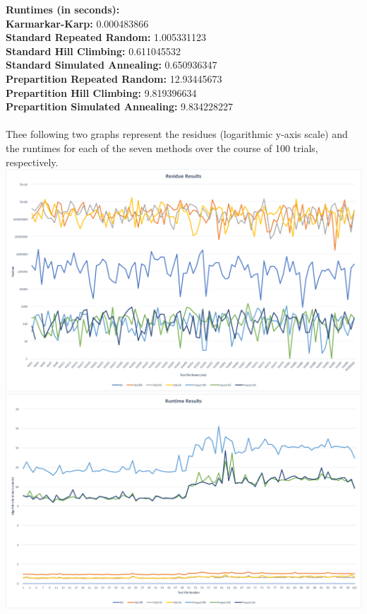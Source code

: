 \documentclass[11pt]{article}
\begin{document}
\indent \textbf{Runtimes (in seconds):} \\
\indent \indent \textbf{Karmarkar-Karp:} 0.000483866\\
\indent \indent \textbf{Standard Repeated Random:} 1.005331123\\
\indent \indent \textbf{Standard Hill Climbing:} 0.611045532\\
\indent \indent \textbf{Standard Simulated Annealing:} 0.650936347\\
\indent \indent \textbf{Prepartition Repeated Random:} 12.93445673\\
\indent \indent \textbf{Prepartition Hill Climbing:} 9.819396634\\
\indent \indent \textbf{Prepartition Simulated Annealing:} 9.834228227\\\\

Thee following two graphs represent the residues (logarithmic y-axis scale) and the runtimes for each of the seven methods over the course of 100 trials, respectively.\\
\includegraphics[width=\linewidth]{residueresults}
\includegraphics[width=\linewidth]{runtimeresults}
\end{document}

